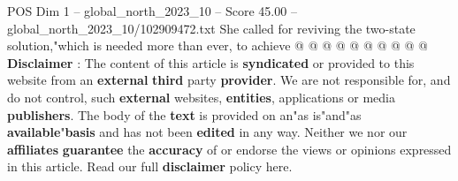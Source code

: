 \begin{textsample}{POS Dim 1 – global\_north\_2023\_10 – Score 45.00 – global\_north\_2023\_10/102909472.txt}
She called for reviving the two-state solution,"which is needed more than ever, to achieve @ @ @ @ @ @ @ @ @ @ \textbf{Disclaimer} : The content of this article is \textbf{syndicated} or provided to this website from an \textbf{external} \textbf{third} party \textbf{provider}.
We are not responsible for, and do not control, such \textbf{external} websites, \textbf{entities}, applications or media \textbf{publishers}.
The body of the \textbf{text} is provided on an"as is"and"as \textbf{available}"\textbf{basis} and has not been \textbf{edited} in any way.
Neither we nor our \textbf{affiliates} \textbf{guarantee} the \textbf{accuracy} of or endorse the views or opinions expressed in this article.
Read our full \textbf{disclaimer} policy here.

\end{textsample}
